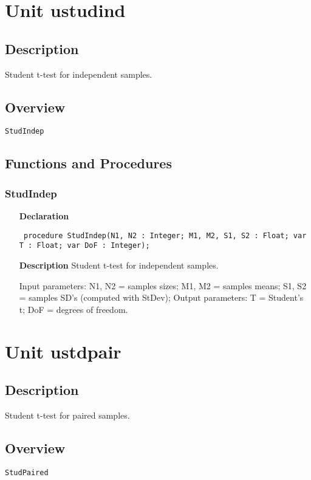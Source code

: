\documentclass[12pt,a4paper,oneside]{report}
\newcommand{\declarationitem}[1]{\textbf{#1}}
\newcommand{\descriptiontitle}[1]{\textbf{#1}}
\newcommand{\code}[1]{\texttt{#1}}
\begin{document}
\section{Unit ustudind}
\label{ustudind}
\subsection{Description}
Student t{-}test for independent samples. \subsection{Overview}
\begin{description}
	\item[\texttt{StudIndep}]
\end{description}
\subsection{Functions and Procedures}
\subsubsection{StudIndep}
\label{ustudind-StudIndep}
\begin{itemize}\item[\declarationitem{Declaration}\hfill]
	\begin{flushleft}
		\code{
			procedure StudIndep(N1, N2 : Integer; M1, M2, S1, S2 : Float; var T : Float; var DoF : Integer);}
	\end{flushleft}
	\item[\descriptiontitle{Description}]
	Student t{-}test for independent samples.
	
	Input parameters: N1, N2 = samples sizes; M1, M2 = samples means; S1, S2 = samples SD's (computed with StDev); Output parameters: T = Student's t; DoF = degrees of freedom.
	
\end{itemize}
\section{Unit ustdpair}
\label{ustdpair}
\subsection{Description}
Student t{-}test for paired samples. 
\subsection{Overview}
\begin{description}
	\item[\texttt{StudPaired}]
\end{description}
\end{document}
